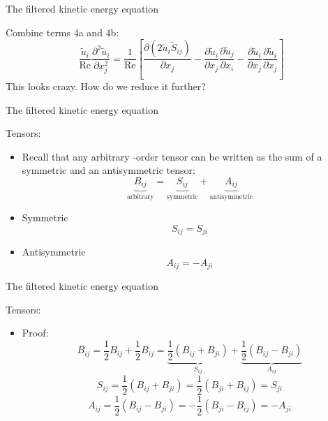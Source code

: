 
\begin{frame}{The filtered kinetic energy equation}

Combine terms 4a and 4b:
$$\frac{\tilde u_i}{\text{Re}} \frac{\partial^2 \tilde u_i}{\partial x_j^{2}} = \frac{1}{\text{Re}}\left[\frac{\partial (2\tilde u_i \tilde S_{ij})}{\partial x_j} - \frac{\partial \tilde u_i}{\partial x_j}\frac{\partial \tilde u_j}{\partial x_i} - \frac{\partial \tilde u_i}{\partial x_j}\frac{\partial \tilde u_i}{\partial x_j}\right]$$
This looks crazy. How do we reduce it further?
\end{frame}


\begin{frame}{The filtered kinetic energy equation}

Tensors:
\begin{itemize}
	\item Recall that any arbitrary -order tensor can be written as the sum of a symmetric and an antisymmetric tensor:
	$$\underbrace{B_{ij}}_{\text{arbitrary}} = \underbrace{S_{ij}}_{\text{symmetric}} + \underbrace{A_{ij}}_{\text{antisymmetric}}$$	
	\item Symmetric
	$$ S_{ij} = S_{ji}$$
	\item Antisymmetric
	$$ A_{ij} = -A_{ji}$$
\end{itemize}
\end{frame}


\begin{frame}{The filtered kinetic energy equation}

Tensors:
\begin{itemize}
	\item Proof:
	$$B_{ij} = \frac{1}{2}B_{ij} + \frac{1}{2}B_{ij} = \underbrace{\frac{1}{2}\left(B_{ij} + B_{ji}\right)}_{S_{ij}} + \underbrace{\frac{1}{2}\left(B_{ij} - B_{ji}\right)}_{A_{ij}} $$
	$$S_{ij} = \frac{1}{2}\left(B_{ij} + B_{ji}\right) = \frac{1}{2}\left(B_{ji} + B_{ij}\right) = S_{ji}$$
	$$A_{ij} = \frac{1}{2}\left(B_{ij} - B_{ji}\right) = -\frac{1}{2}\left(B_{ji} - B_{ij}\right) = -A_{ji}$$
\end{itemize}
\end{frame}


